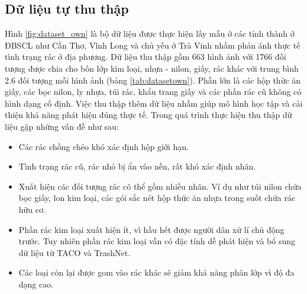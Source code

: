 \documentclass[../the.tex]{subfiles}
\begin{document}
\subsection{Dữ liệu tự thu thập}
\label{sec:own}
{\fontsize{13}{12} \selectfont

	Hình \ref{fig:dataset_own} là bộ dữ liệu được thực hiện lấy mẫu ở các tỉnh thành ở ĐBSCL như Cần Thơ, Vĩnh Long và chủ yếu ở Trà Vinh nhầm phản ánh thực tế tình trạng rác ở địa phương.
	Dữ liệu thu thập gồm 663 hình ảnh với 1766 đối tượng được chia cho bốn lớp kim loại, nhựa - nilon, giấy, rác khác với trung bình 2.6 đối tượng mỗi hình ảnh (bảng \ref{tab:datasetown}).
	Phần lớn là các hộp thức ăn giấy, các bọc nilon, ly nhựa, túi rác, khẩu trang giấy và các phần rác cũ không có hình dạng cố định.
	Việc thu thập thêm dữ liệu nhầm giúp mô hình học tập và cải thiện khả năng phát hiện đúng thực tế. Trong quá trình thực hiện thu thập dữ liệu gặp những vấn đề như sau:

	\begin{itemize}
		\item Các rác chồng chéo khó xác định hộp giới hạn.
		\item Tình trạng rác cũ, rác nhỏ bị ẩn vào nền, rất khó xác định nhãn.
		\item Xuất hiện các đối tượng rác có thể gồm nhiều nhãn. Ví dụ như túi nilon chứa bọc giấy, lon kim loại, các gói sắc nét hộp thức ăn nhựa trong suốt chứa rác hữu cơ.
		\item Phần rác kim loại xuất hiện ít, vì hầu hết được người dân xử lí chủ động trước. Tuy nhiên phần rác kim loại vẫn có đặc tính dễ phát hiện và bổ sung dữ liệu từ TACO \cite{proença2020taco} và TrashNet.
		\item Các loại còn lại được gom vào rác khác sẽ giảm khả năng phân lớp vì độ đa dạng cao.
	\end{itemize}

}
\end{document}
